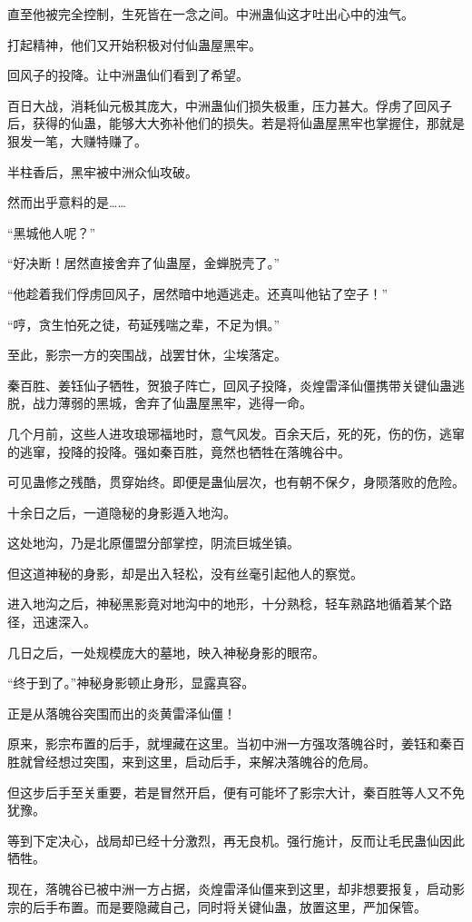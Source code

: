 \begin{this_body}
直至他被完全控制，生死皆在一念之间。中洲蛊仙这才吐出心中的浊气。

打起精神，他们又开始积极对付仙蛊屋黑牢。

回风子的投降。让中洲蛊仙们看到了希望。

百日大战，消耗仙元极其庞大，中洲蛊仙们损失极重，压力甚大。俘虏了回风子后，获得的仙蛊，能够大大弥补他们的损失。若是将仙蛊屋黑牢也掌握住，那就是狠发一笔，大赚特赚了。

半柱香后，黑牢被中洲众仙攻破。

然而出乎意料的是……

“黑城他人呢？”

“好决断！居然直接舍弃了仙蛊屋，金蝉脱壳了。”

“他趁着我们俘虏回风子，居然暗中地遁逃走。还真叫他钻了空子！”

“哼，贪生怕死之徒，苟延残喘之辈，不足为惧。”

至此，影宗一方的突围战，战罢甘休，尘埃落定。

秦百胜、姜钰仙子牺牲，贺狼子阵亡，回风子投降，炎煌雷泽仙僵携带关键仙蛊逃脱，战力薄弱的黑城，舍弃了仙蛊屋黑牢，逃得一命。

几个月前，这些人进攻琅琊福地时，意气风发。百余天后，死的死，伤的伤，逃窜的逃窜，投降的投降。强如秦百胜，竟然也牺牲在落魄谷中。

可见蛊修之残酷，贯穿始终。即便是蛊仙层次，也有朝不保夕，身陨落败的危险。

十余日之后，一道隐秘的身影遁入地沟。

这处地沟，乃是北原僵盟分部掌控，阴流巨城坐镇。

但这道神秘的身影，却是出入轻松，没有丝毫引起他人的察觉。

进入地沟之后，神秘黑影竟对地沟中的地形，十分熟稔，轻车熟路地循着某个路径，迅速深入。

几日之后，一处规模庞大的墓地，映入神秘身影的眼帘。

“终于到了。”神秘身影顿止身形，显露真容。

正是从落魄谷突围而出的炎黄雷泽仙僵！

原来，影宗布置的后手，就埋藏在这里。当初中洲一方强攻落魄谷时，姜钰和秦百胜就曾经想过突围，来到这里，启动后手，来解决落魄谷的危局。

但这步后手至关重要，若是冒然开启，便有可能坏了影宗大计，秦百胜等人又不免犹豫。

等到下定决心，战局却已经十分激烈，再无良机。强行施计，反而让毛民蛊仙因此牺牲。

现在，落魄谷已被中洲一方占据，炎煌雷泽仙僵来到这里，却非想要报复，启动影宗的后手布置。而是要隐藏自己，同时将关键仙蛊，放置这里，严加保管。


\end{this_body}
